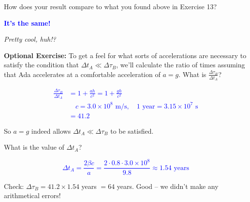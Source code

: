 \documentclass[11pt, letterpaper, openany]{book}
\begin{document}
How does your result compare to what you found above in Exercise 13?

\textcolor{blue}{\textbf{It's the same!}}

\textit{Pretty cool, huh!?}

\textbf{Optional Exercise:} To get a feel for what sorts of accelerations are necessary to satisfy the condition that $\Delta t_A \ll \Delta\tau_B$, we'll calculate the ratio of times assuming that Ada accelerates at a comfortable acceleration of $a = g$. What is $\frac{\Delta\tau_B}{\Delta t_A}$?

\textcolor{blue}{
\begin{align*}
    \frac{\Delta\tau_B}{\Delta t_A} &= 1 + \frac{ah}{c^2} = 1 + \frac{gh}{c^2} \\
    &\quad c = 3.0 \times 10^8 \text{ m/s}, \quad 1 \text{ year} = 3.15 \times 10^7 \text{ s} \\
    &= 41.2
\end{align*}
}

So $a = g$ indeed allows $\Delta t_A \ll \Delta\tau_B$ to be satisfied.

What is the value of $\Delta t_A$?

\textcolor{blue}{
\[ \Delta t_A = \frac{2\beta c}{a} = \frac{2 \cdot 0.8 \cdot 3.0 \times 10^8}{9.8} \approx 1.54 \text{ years} \]
}

Check: $\Delta\tau_B = 41.2 \times 1.54$ years $= 64$ years. Good -- we didn't make any arithmetical errors!
\end{document}
